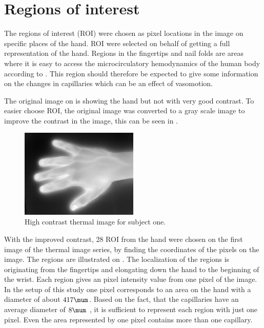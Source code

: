 \section{Regions of interest}

The regions of interest (ROI) were chosen as pixel locations in the image on specific places of the hand. ROI were selected on behalf of getting a full representation of the hand. 
Regions in the fingertips and nail folds are areas where it is easy to access the microcirculatory hemodynamics of the human body according to \cite{Iabichella2006}. This region should therefore be expected to give some information on the changes in capillaries which can be an effect of vasomotion. 

The original image on  is showing the hand but not with very good contrast. To easier choose ROI, the original image was converted to a gray scale image to improve the contrast in the image, this can be seen in . 

\begin{figure}[H]
	\includegraphics[width=0.5\textwidth]{figures/mat2grayHand}  %
	\caption{High contrast thermal image for subject one.}
	\label{fig:mat2grayHand}  %
\end{figure}

With the improved contrast, 28 ROI from the hand were chosen on the first image of the thermal image series, by finding the coordinates of the pixels on the image. The regions are illustrated on . The localization of the regions is originating from the fingertips and elongating down the hand to the beginning of the wrist. Each region gives an pixel intensity value from one pixel of the image. In the setup of this study one pixel corresponds to an area on the hand with a diameter of about $417\mum$. Based on the fact, that the capillaries have an average diameter of $8\mum$ \cite{martini2012}, it is sufficient to represent each region with just one pixel. Even the area represented by one pixel contains more than one capillary.

